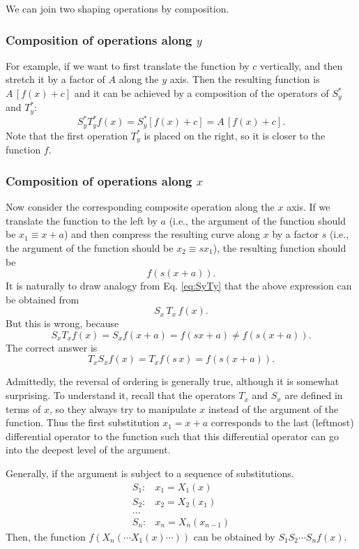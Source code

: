 \documentclass{article}
\begin{document}
We can join two shaping operations by composition.


\subsubsection{Composition of operations along $y$}

For example, if we want to first translate the function by $c$ vertically,
and then stretch it by a factor of $A$ along the $y$ axis.
Then the resulting function is $A \, [f(x) + c]$
and it can be achieved by a composition of the operators
of $S_y^*$ and $T_y^*$:
\begin{equation}
S_y^* T_y^* f(x) = S_y^* [f(x) + c] = A \, [f(x) + c].
\label{eq:SyTy}
\end{equation}
Note that the first operation $T_y^*$ is placed on the right,
so it is closer to the function $f$.


\subsubsection{Composition of operations along $x$}

Now consider the corresponding composite operation along the $x$ axis.
%
If we translate the function to the left by $a$ (i.e.,
the argument of the function should be $x_1 \equiv x + a$)
and then compress the resulting curve along $x$ by a factor $s$ (i.e.,
the argument of the function should be $x_2 \equiv s x_1$),
the resulting function should be
$$
  f(s(x+a)).
$$
%
It is naturally to draw analogy from Eq. \eqref{eq:SyTy} that
the above expression can be obtained from
$$
S_x \, T_x \, f(x).
$$
But this is wrong, because
$$
S_x T_x f(x) = S_x f(x + a) = f(s x + a) \ne f(s (x + a)).
$$
The correct answer is
$$
T_x S_x f(x) = T_x f(s \, x) = f(s (x + a)).
$$

Admittedly, the reversal of ordering is generally true,
although it is somewhat surprising.
To understand it,
recall that the operators $T_x$ and $S_x$
are defined in terms of $x$,
so they always try to manipulate $x$
instead of the argument of the function.
Thus the first substitution $x_1 = x + a$
corresponds to the last (leftmost) differential operator
to the function such that this differential operator
can go into the deepest level of the argument.

Generally, if the argument is subject to a sequence of substitutions.
$$
\begin{aligned}
S_1: & x_1 = X_1(x) \\
S_2: & x_2 = X_2(x_1) \\
\dots \\
S_n: & x_n = X_n(x_{n-1})
\end{aligned}
$$
Then, the function $f(X_n(\cdots X_1(x)\cdots))$
can be obtained by
$S_1 S_2 \cdots S_n f(x)$.
\end{document}
